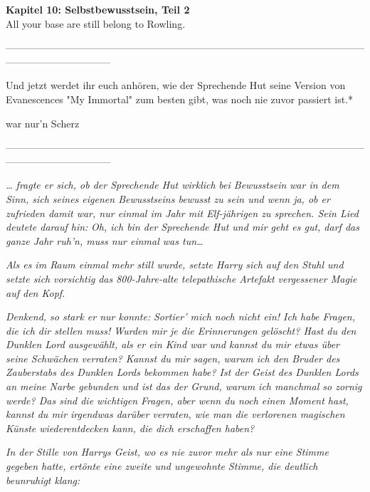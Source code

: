 

\hypertarget{selbstbewusstsein-teil-2}{%

\textbf{Kapitel 10: Selbstbewusstsein, Teil 2}\\

All your base are still belong to Rowling.

--------------------------------------------------------------------------------------------------------------------------------------------

Und jetzt werdet ihr euch anhören, wie der Sprechende Hut seine Version von Evanescences "My Immortal" zum besten gibt, was noch nie zuvor passiert ist.*

war nur'n Scherz

--------------------------------------------------------------------------------------------------------------------------------------------

\emph{… fragte er sich, ob der Sprechende Hut wirklich} \emph{\emph{bei Bewusstsein}} \emph{war in dem Sinn, sich seines eigenen Bewusstseins bewusst zu sein und wenn ja, ob er zufrieden damit war, nur einmal im Jahr mit Elf-jährigen zu sprechen. Sein Lied deutete darauf hin:} \emph{\emph{Oh, ich bin der Sprechende Hut und mir geht es gut, darf das ganze Jahr ruh'n, muss nur einmal was tun…}}

\emph{Als es im Raum einmal mehr still wurde, setzte Harry sich auf den Stuhl und setzte sich} \emph{\emph{vorsichtig}} \emph{das 800-Jahre-alte telepathische Artefakt vergessener Magie auf den Kopf.}

\emph{Denkend, so stark er nur konnte:} \emph{\emph{Sortier' mich noch nicht ein! Ich habe Fragen, die ich dir stellen muss! Wurden mir je die Erinnerungen gelöscht? Hast du den Dunklen Lord ausgewählt, als er ein Kind war und kannst du mir etwas über seine Schwächen verraten? Kannst du mir sagen, warum ich den Bruder des Zauberstabs des Dunklen Lords bekommen habe? Ist der Geist des Dunklen Lords an meine Narbe gebunden und ist das der Grund, warum ich manchmal so zornig werde? Das sind die wichtigen Fragen, aber wenn du noch einen Moment hast, kannst du mir irgendwas darüber verraten, wie man die verlorenen magischen Künste wiederentdecken kann, die dich erschaffen haben?}}

\emph{In der Stille von Harrys Geist, wo es nie zuvor mehr als nur eine Stimme gegeben hatte, ertönte eine zweite und ungewohnte Stimme, die deutlich beunruhigt klang:}

}
